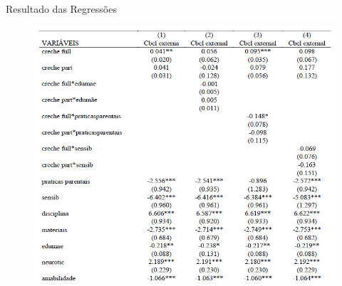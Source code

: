 \documentclass[10pt]{Beamer}
\begin{document}
\begin{frame}{Resultado das Regressões}
	
\begin{figure}[h]
\centering
\includegraphics[width=1.0\textwidth]{Tab6}
\end{figure}
	
\end{frame}
	
\end{document}
